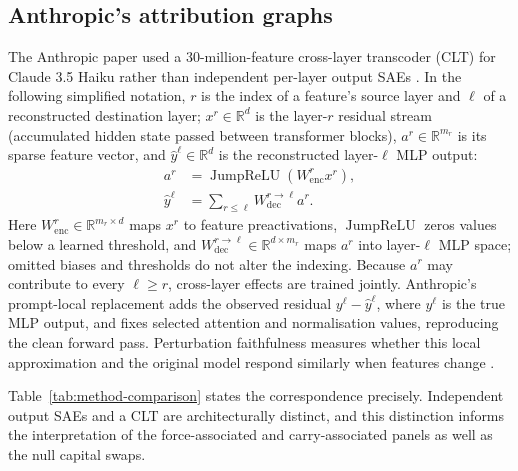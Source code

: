 \documentclass[11pt,a4paper]{article}
\begin{document}
\subsection{Anthropic's attribution graphs}

    The Anthropic paper used a 30-million-feature cross-layer transcoder (CLT) for Claude 3.5 Haiku rather than independent per-layer output SAEs \cite{lindsey2025biology}. In the following simplified notation, $r$ is the index of a feature's source layer and $\ell$ of a reconstructed destination layer; $x^r\in\mathbb{R}^{d}$ is the layer-$r$ residual stream (accumulated hidden state passed between transformer blocks), $a^r\in\mathbb{R}^{m_r}$ is its sparse feature vector, and $\hat y^\ell\in\mathbb{R}^{d}$ is the reconstructed layer-$\ell$ MLP output:
\begin{align}     a^r &= \operatorname{JumpReLU}(W_{\mathrm{enc}}^r x^r), \\
    \hat{y}^{\ell} &= \sum_{r\leq\ell}W_{\mathrm{dec}}^{r\rightarrow\ell}a^r.
\end{align}
    Here $W_{\mathrm{enc}}^r\in\mathbb{R}^{m_r\times d}$ maps $x^r$ to feature preactivations, $\operatorname{JumpReLU}$ zeros values below a learned threshold, and $W_{\mathrm{dec}}^{r\rightarrow\ell}\in\mathbb{R}^{d\times m_r}$ maps $a^r$ into layer-$\ell$ MLP space; omitted biases and thresholds do not alter the indexing. Because $a^r$ may contribute to every $\ell\geq r$, cross-layer effects are trained jointly. Anthropic's prompt-local replacement adds the observed residual $y^\ell-\hat y^\ell$, where $y^\ell$ is the true MLP output, and fixes selected attention and normalisation values, reproducing the clean forward pass. Perturbation faithfulness measures whether this local approximation and the original model respond similarly when features change \cite{ameisen2025circuit}.

    Table~\ref{tab:method-comparison} states the correspondence precisely. Independent output SAEs and a CLT are architecturally distinct, and this distinction informs the interpretation of the force-associated and carry-associated panels as well as the null capital swaps.
\end{document}
